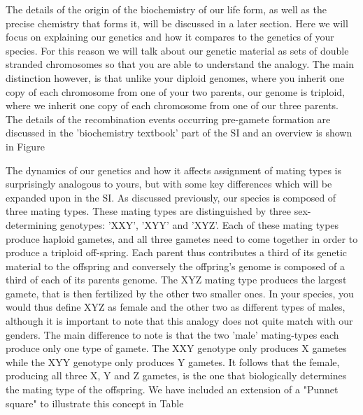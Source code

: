 The details of the origin of the biochemistry of our life form, as well as the precise chemistry that forms it, will be discussed in a later section. Here we will focus on explaining our genetics and how it compares to the genetics of your species. For this reason we will talk about our genetic material as sets of double stranded chromosomes so that you are able to understand the analogy. The main distinction however, is that unlike your diploid genomes, where you inherit one copy of each chromosome from one of your two parents, our genome is triploid, where we inherit one copy of each chromosome from one of our three parents. The details of the recombination events occurring pre-gamete formation are discussed in the 'biochemistry textbook' part of the SI and an overview is shown in Figure 

The dynamics of our genetics and how it affects assignment of mating types is surprisingly analogous to yours, but with some key differences which will be expanded upon in the SI. As discussed previously, 
our species is composed of three mating types. These mating types are distinguished by three sex-determining genotypes: 'XXY', 'XYY' and 'XYZ'. Each of these mating types produce haploid gametes, and all three gametes need to come together in order to produce a triploid off-spring. Each parent thus contributes a third of its genetic material to the offspring and conversely the offpring's genome is composed of a third of each of its parents genome.
The XYZ mating type produces the largest gamete, that is then fertilized by the other two smaller ones. In your species, you would thus define XYZ as female and the other two as different types of males, although it is important to note that this analogy does not quite match with our genders. The main difference to note is that the two 'male' mating-types each produce only one type of gamete. The XXY genotype only produces X gametes while the XYY genotype only produces Y gametes. It follows that the female, producing all three X, Y and Z gametes, is the one that biologically determines the mating type of the offspring. We have included an extension of a "Punnet square" to illustrate this concept in Table 

